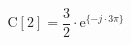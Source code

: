 \begin{center}
\[
\textrm{C}[2] = \frac{3}{2} \cdot \textrm{e}^{\{ -j \cdot 3\pi \}}
\]
\end{center}
